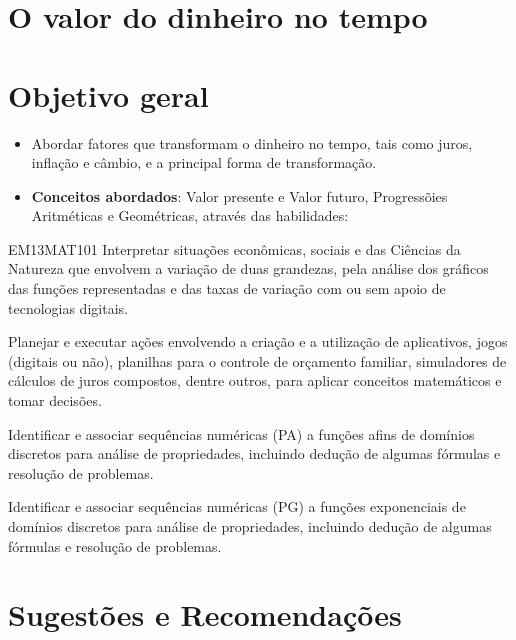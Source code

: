 \begin{paginatexto}\raggedcolumns
\section*{O valor do dinheiro no tempo}

\section*{Objetivo geral}

\begin{itemize}
\item Abordar fatores que transformam o dinheiro no tempo, tais como juros, inflação e câmbio, e a principal forma de transformação.

\item \textbf{Conceitos abordados}: Valor presente e Valor futuro, Progressõies Aritméticas e Geométricas, através das habilidades:
\end{itemize}

\begin{habilities}{EM13MAT101}
 Interpretar situações econômicas, sociais e das Ciências da Natureza
que envolvem a variação de duas grandezas, pela análise dos gráficos das funções representadas e das taxas de variação com ou sem apoio de tecnologias digitais.

Planejar e executar ações envolvendo a criação e a utilização de aplicativos, jogos (digitais ou não), planilhas para o controle de orçamento familiar, simuladores de cálculos de juros compostos, dentre outros, para aplicar conceitos matemáticos e tomar decisões. 

Identificar e associar sequências numéricas (PA) a funções afins de domínios discretos para análise de propriedades, incluindo dedução de algumas fórmulas e resolução de problemas.

Identificar e associar sequências numéricas (PG) a funções exponenciais de domínios discretos para análise de propriedades, incluindo dedução de algumas fórmulas e resolução de problemas.
\end{habilities}

\section*{Sugestões e Recomendações}

\end{paginatexto}
